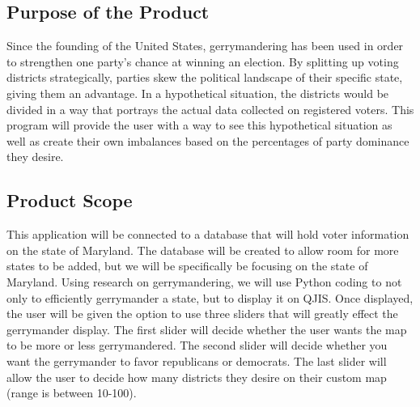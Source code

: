 \documentclass{article}
\begin{document}
\vspace{2.5mm}


\subsection{Purpose of the Product}

\vspace{2.5mm}

\begin{addmargin}[4em]{0em}

Since the founding of the United States, gerrymandering has been used in order to strengthen one party's chance at winning an election. By splitting up voting districts strategically, parties skew the political landscape of their specific state, giving them an advantage. In a hypothetical situation, the districts would be divided in a way that portrays the actual data collected on registered voters. This program will provide the user with a way to see this hypothetical situation as well as create their own imbalances based on the percentages of party dominance they desire.

\vspace{2.5mm}

\end{addmargin}


\subsection{Product Scope}

\vspace{2.5mm}

\begin{addmargin}[4em]{0em}

This application will be connected to a database that will hold voter information on the state of Maryland. The database will be created to allow room for more states to be added, but we will be specifically be focusing on the state of Maryland. Using research on gerrymandering, we will use Python coding to not only to efficiently gerrymander a state, but to display it on QJIS. Once displayed, the user will be given the option to use three sliders that will greatly effect the gerrymander display. The first slider will decide whether the user wants the map to be more or less gerrymandered. The second slider will decide whether you want the gerrymander to favor republicans or democrats. The last slider will allow the user to decide how many districts they desire on their custom map (range is between 10-100).

\end{addmargin}
\end{document}
